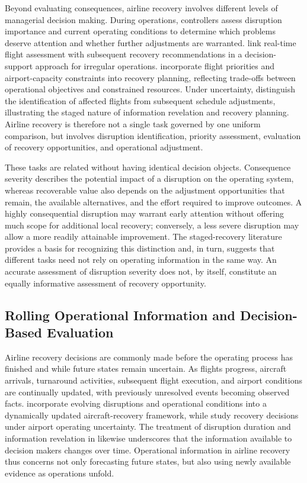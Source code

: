 Beyond evaluating consequences, airline recovery involves different levels of managerial decision making. During operations, controllers assess disruption importance and current operating conditions to determine which problems deserve attention and whether further adjustments are warranted. \citet{peiDecisionSupportIrregular2021} link real-time flight assessment with subsequent recovery recommendations in a decision-support approach for irregular operations. \citet{jiFlightPrioritiesRecovery2021} incorporate flight priorities and airport-capacity constraints into recovery planning, reflecting trade-offs between operational objectives and constrained resources. Under uncertainty, \citet{zhaoTwoStageAircraftRecovery2023} distinguish the identification of affected flights from subsequent schedule adjustments, illustrating the staged nature of information revelation and recovery planning. Airline recovery is therefore not a single task governed by one uniform comparison, but involves disruption identification, priority assessment, evaluation of recovery opportunities, and operational adjustment.

These tasks are related without having identical decision objects. Consequence severity describes the potential impact of a disruption on the operating system, whereas recoverable value also depends on the adjustment opportunities that remain, the available alternatives, and the effort required to improve outcomes. A highly consequential disruption may warrant early attention without offering much scope for additional local recovery; conversely, a less severe disruption may allow a more readily attainable improvement. The staged-recovery literature provides a basis for recognizing this distinction and, in turn, suggests that different tasks need not rely on operating information in the same way. An accurate assessment of disruption severity does not, by itself, constitute an equally informative assessment of recovery opportunity.

\subsection{Rolling Operational Information and Decision-Based Evaluation}
\label{subsec:rw_uncertainty}

Airline recovery decisions are commonly made before the operating process has finished and while future states remain uncertain. As flights progress, aircraft arrivals, turnaround activities, subsequent flight execution, and airport conditions are continually updated, with previously unresolved events becoming observed facts. \citet{vinkDynamicAircraftRecovery2020} incorporate evolving disruptions and operational conditions into a dynamically updated aircraft-recovery framework, while \citet{leeDynamicDisruptionManagement2020} study recovery decisions under airport operating uncertainty. The treatment of disruption duration and information revelation in \citet{zhaoTwoStageAircraftRecovery2023} likewise underscores that the information available to decision makers changes over time. Operational information in airline recovery thus concerns not only forecasting future states, but also using newly available evidence as operations unfold.

